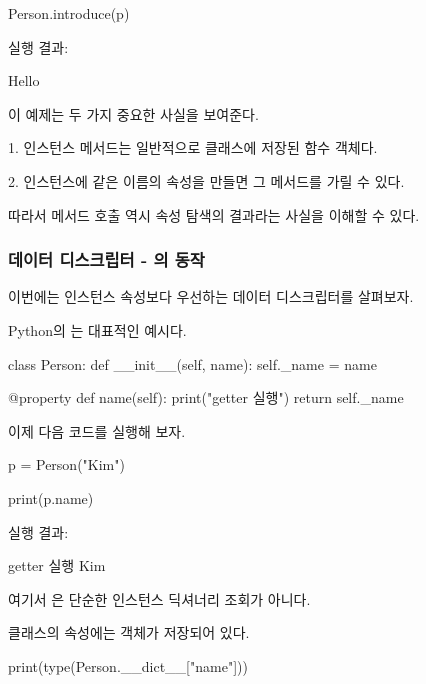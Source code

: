 \begin{dhkcode}
Person.introduce(p)
\end{dhkcode}

실행 결과:

\begin{dhkzsh}
Hello
\end{dhkzsh}

이 예제는 두 가지 중요한 사실을 보여준다.

\begin{dhksmry}
1. 인스턴스 메서드는 일반적으로 클래스에 저장된 함수 객체다.

2. 인스턴스에 같은 이름의 속성을 만들면 그 메서드를 가릴 수 있다.
\end{dhksmry}

따라서 메서드 호출 역시 속성 탐색의 결과라는 사실을 이해할 수 있다.

\subsubsection{데이터 디스크립터 - 의 동작}

이번에는 인스턴스 속성보다 우선하는 데이터 디스크립터를 살펴보자.

Python의 는 대표적인 예시다.

\begin{dhkcode}
class Person:
    def __init__(self, name):
        self._name = name

    @property
    def name(self):
        print("getter 실행")
        return self._name
\end{dhkcode}

이제 다음 코드를 실행해 보자.

\begin{dhkcode}
p = Person("Kim")

print(p.name)
\end{dhkcode}

실행 결과:

\begin{dhkzsh}
getter 실행
Kim
\end{dhkzsh}

여기서 은 단순한 인스턴스 딕셔너리 조회가 아니다.

 클래스의  속성에는  객체가 저장되어 있다.

\begin{dhkcode}
print(type(Person.__dict__["name"]))
\end{dhkcode}

